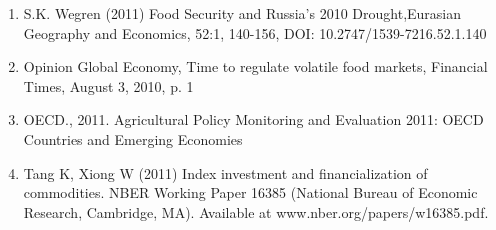 \documentclass[a4paper,12pt]{article}
\begin{document}
\begin{enumerate}
    \item S.K. Wegren (2011) Food Security and Russia's 2010 Drought,Eurasian Geography and Economics, 52:1, 140-156, DOI: 10.2747/1539-7216.52.1.140

    \item Opinion Global Economy, Time to regulate volatile food markets, Financial Times, August 3, 2010, p. 1

    \item OECD., 2011. Agricultural Policy Monitoring and Evaluation 2011: OECD Countries and Emerging Economies

    \item Tang K, Xiong W (2011) Index investment and financialization of commodities. NBER Working Paper 16385 (National Bureau of Economic Research, Cambridge, MA). Available at www.nber.org/papers/w16385.pdf.


\end{enumerate}
\end{document}
